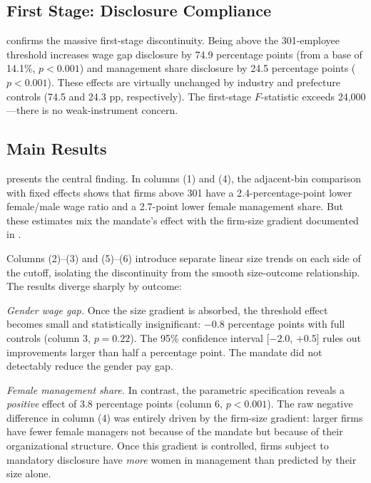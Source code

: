 \documentclass[12pt]{article}
\begin{document}
\subsection{First Stage: Disclosure Compliance}



 confirms the massive first-stage discontinuity. Being above the 301-employee threshold increases wage gap disclosure by 74.9 percentage points (from a base of 14.1\%, $p < 0.001$) and management share disclosure by 24.5 percentage points ($p < 0.001$). These effects are virtually unchanged by industry and prefecture controls (74.5 and 24.3 pp, respectively). The first-stage $F$-statistic exceeds 24,000---there is no weak-instrument concern.

\subsection{Main Results}



 presents the central finding. In columns (1) and (4), the adjacent-bin comparison with fixed effects shows that firms above 301 have a 2.4-percentage-point lower female/male wage ratio and a 2.7-point lower female management share. But these estimates mix the mandate's effect with the firm-size gradient documented in .

Columns (2)--(3) and (5)--(6) introduce separate linear size trends on each side of the cutoff, isolating the discontinuity from the smooth size-outcome relationship. The results diverge sharply by outcome:

\textit{Gender wage gap.} Once the size gradient is absorbed, the threshold effect becomes small and statistically insignificant: $-0.8$ percentage points with full controls (column 3, $p = 0.22$). The 95\% confidence interval [$-2.0$, $+0.5$] rules out improvements larger than half a percentage point. The mandate did not detectably reduce the gender pay gap.

\textit{Female management share.} In contrast, the parametric specification reveals a \textit{positive} effect of 3.8 percentage points (column 6, $p < 0.001$). The raw negative difference in column (4) was entirely driven by the firm-size gradient: larger firms have fewer female managers not because of the mandate but because of their organizational structure. Once this gradient is controlled, firms subject to mandatory disclosure have \textit{more} women in management than predicted by their size alone.
\end{document}
